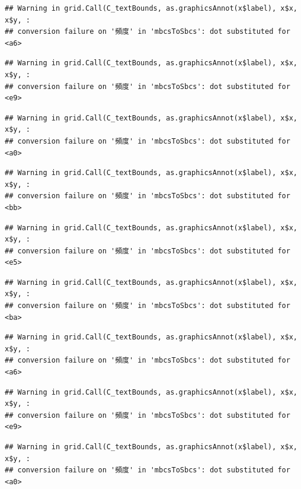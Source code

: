 \documentclass[
]{book}
\begin{document}
\begin{verbatim}
## Warning in grid.Call(C_textBounds, as.graphicsAnnot(x$label), x$x, x$y, :
## conversion failure on '頻度' in 'mbcsToSbcs': dot substituted for <a6>
\end{verbatim}

\begin{verbatim}
## Warning in grid.Call(C_textBounds, as.graphicsAnnot(x$label), x$x, x$y, :
## conversion failure on '頻度' in 'mbcsToSbcs': dot substituted for <e9>
\end{verbatim}

\begin{verbatim}
## Warning in grid.Call(C_textBounds, as.graphicsAnnot(x$label), x$x, x$y, :
## conversion failure on '頻度' in 'mbcsToSbcs': dot substituted for <a0>
\end{verbatim}

\begin{verbatim}
## Warning in grid.Call(C_textBounds, as.graphicsAnnot(x$label), x$x, x$y, :
## conversion failure on '頻度' in 'mbcsToSbcs': dot substituted for <bb>
\end{verbatim}

\begin{verbatim}
## Warning in grid.Call(C_textBounds, as.graphicsAnnot(x$label), x$x, x$y, :
## conversion failure on '頻度' in 'mbcsToSbcs': dot substituted for <e5>
\end{verbatim}

\begin{verbatim}
## Warning in grid.Call(C_textBounds, as.graphicsAnnot(x$label), x$x, x$y, :
## conversion failure on '頻度' in 'mbcsToSbcs': dot substituted for <ba>
\end{verbatim}

\begin{verbatim}
## Warning in grid.Call(C_textBounds, as.graphicsAnnot(x$label), x$x, x$y, :
## conversion failure on '頻度' in 'mbcsToSbcs': dot substituted for <a6>
\end{verbatim}

\begin{verbatim}
## Warning in grid.Call(C_textBounds, as.graphicsAnnot(x$label), x$x, x$y, :
## conversion failure on '頻度' in 'mbcsToSbcs': dot substituted for <e9>
\end{verbatim}

\begin{verbatim}
## Warning in grid.Call(C_textBounds, as.graphicsAnnot(x$label), x$x, x$y, :
## conversion failure on '頻度' in 'mbcsToSbcs': dot substituted for <a0>
\end{verbatim}
\end{document}
